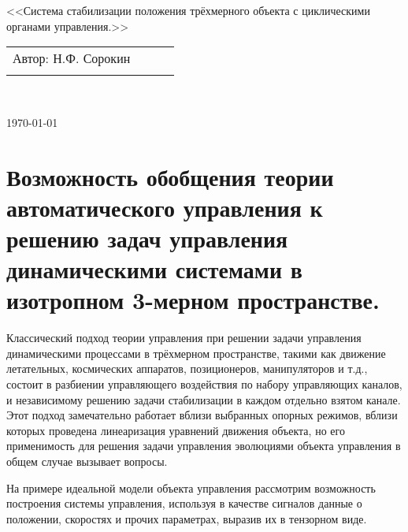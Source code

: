 \documentclass[a4paper]{article}
\begin{document}
\begin{center}
\hfill \break
\hfill\break
\hfill \break
\hfill \break
\hfill \break
\hfill \break
\hfill \break
\hfill \break
\hfill \break
\hfill \break
\large{<<Система стабилизации положения трёхмерного объекта с циклическими органами управления.>>}\\
\hfill \break
\hfill \break
\hfill \break
\hfill \break
\hfill \break
\hfill \break
\hfill \break
\hfill \break
\end{center}
 
\normalsize{ 
\begin{tabular}{lccl}
Автор: Н.Ф. Сорокин\\\\
\end{tabular}
}\\
\hfill \break
\hfill \break
\hfill \break
\hfill \break
\hfill \break
\begin{center} \today \end{center}
\thispagestyle{empty} %
\newpage


\section{Возможность обобщения теории автоматического управления к решению задач управления динамическими системами в изотропном 3-мерном пространстве.}

Классический подход теории управления при решении задачи управления динамическими процессами в трёхмерном пространстве, такими как движение летательных, космических аппаратов, позиционеров, манипуляторов и т.д., состоит в разбиении управляющего воздействия по набору управляющих каналов, и независимому решению задачи стабилизации в каждом отдельно взятом канале. Этот подход замечательно работает вблизи выбранных опорных режимов, вблизи которых проведена линеаризация уравнений движения объекта, но его применимость для решения задачи управления эволюциями объекта управления в общем случае вызывает вопросы.

На примере идеальной модели объекта управления рассмотрим возможность построения системы управления, используя в качестве сигналов данные о положении, скоростях и прочих параметрах, выразив их в тензорном виде.
\end{document}
